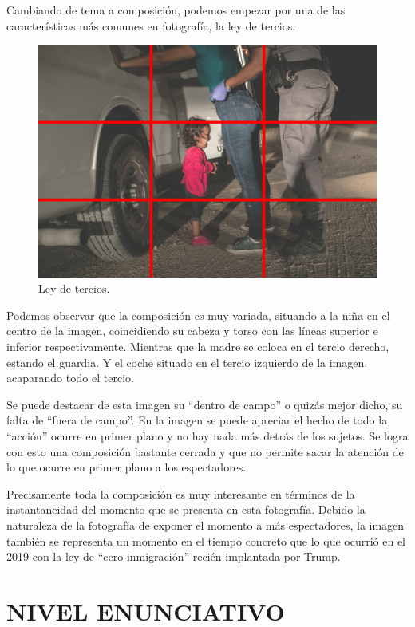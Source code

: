 \documentclass[11pt]{article}
\begin{document}
Cambiando de tema a composición, podemos empezar por una de las características más comunes en fotografía, la ley de tercios.
\begin{figure}[H]
	\includegraphics[scale = 0.5]{Images/rulethrids.png}
	\caption{Ley de tercios.}
	\label{fig:rulethrids}
\end{figure}

Podemos observar que la composición es muy variada, situando a la niña en el centro de la imagen, coincidiendo su cabeza y torso con las líneas superior e inferior respectivamente. Mientras que la madre se coloca en el tercio derecho, estando el guardia. Y el coche situado en el tercio izquierdo de la imagen, acaparando todo el tercio. \newline

Se puede destacar de esta imagen su “dentro de campo” o quizás mejor dicho, su falta de “fuera de campo”. En la imagen se puede apreciar el hecho de todo la “acción” ocurre en primer plano y no hay nada más detrás de los sujetos. Se logra con esto una composición bastante cerrada y que no permite sacar la atención de lo que ocurre en primer plano a los espectadores. \newline

Precisamente toda la composición es muy interesante en términos de la instantaneidad del momento que se presenta en esta fotografía. Debido la naturaleza de la fotografía de exponer el momento a más espectadores, la imagen también se representa un momento en el tiempo concreto que lo que ocurrió en el 2019 con la ley de “cero-inmigración” recién implantada por Trump. \newline

\section{NIVEL ENUNCIATIVO}
\end{document}
